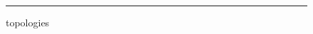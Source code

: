 \documentclass[12pt]{article}
\theoremstyle{definition}
\begin{document}
\begin{figure}[htb]
  \centering
  \begin{subfigure} {\texttt{[image: grid.png]}} \end{subfigure}
  \begin{subfigure} {\texttt{[image: random.png]}} \end{subfigure}
  \rule{\linewidth}{1pt}
  \caption{topologies}
\end{figure}




\end{document}
